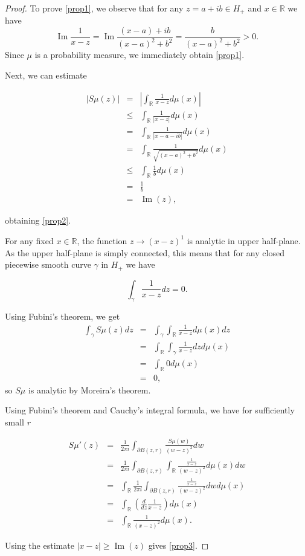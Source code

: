 \documentclass[12pt,a4paper,leqno]{report}
\newcommand{\R}{\mathbb{R}}
\renewcommand{\Im}{\operatorname{Im}}
\theoremstyle{plain}
\theoremstyle{definition}
\theoremstyle{remark}
\begin{document}
\begin{proof}
To prove \ref{prop1}, we observe that for any $z = a + ib \in H_+$ and $x \in \R$ we have
\begin{equation*}
\Im\frac{1}{x-z} = \Im\frac{(x-a) +ib}{(x-a)^2+b^2} = \frac{b}{(x-a)^2+b^2} > 0.
\end{equation*}
Since $\mu$ is a probability measure, we immediately obtain \ref{prop1}.

Next, we can estimate

\begin{eqnarray*}
|S\mu(z)| & = & \left| \int_{\R} \frac{1}{x-z} d \mu(x)  \right|\\
& \leq & \int_{\R} \frac{1}{|x-z|} d \mu(x)\\
& = & \int_{\R} \frac{1}{|x-a-ib|} d \mu(x)\\
& = & \int_{\R} \frac{1}{\sqrt{(x-a)^2+b^2}} d \mu(x)\\
& \leq & \int_{\R} \frac{1}{b} d \mu(x)\\
& = & \frac{1}{b}\\
& = & \Im(z),
\end{eqnarray*}

obtaining \ref{prop2}.

For any fixed $x \in \R$, the function $z \to (x-z)^1$ is analytic in upper half-plane. As the upper half-plane is simply connected, this means that for any closed piecewise smooth curve $\gamma$ in $H_+$ we have

\begin{equation*}
\int_{\gamma} \frac{1}{x-z}dz = 0.
\end{equation*}

Using Fubini's theorem, we get
\begin{eqnarray*}
\int_\gamma S\mu(z) dz & = & 
\int_{\gamma} \int_{\R} \frac{1}{x-z} d\mu(x) dz\\
& = & \int_{\R} \int_{\gamma} \frac{1}{x-z} dz d\mu(x)\\
& = & \int_{\R} 0 d\mu(x)\\
& = & 0,
\end{eqnarray*}
so $S\mu$ is analytic by Moreira's theorem.

Using Fubini's theorem and Cauchy's integral formula, we have for sufficiently small $r$ 

\begin{eqnarray*}
S\mu '(z) & = & \frac{1}{2\pi i}
\int_{\partial B(z,r)} \frac{S\mu(w)}{(w - z)^2} dw\\
& = & \frac{1}{2\pi i}
\int_{\partial B(z,r)} \int_{\R} \frac{\frac{1}{x-z}}{(w - z)^2} d\mu(x) dw\\
& = &
\int_{\R} \frac{1}{2\pi i} \int_{\partial B(z,r)} \frac{\frac{1}{x-z}}{(w - z)^2} dw d\mu(x)\\
& = & \int_{\R} \left( \frac{d}{dz} \frac{1}{x-z} \right) d\mu(x)\\
& = & \int_{\R}\frac{1}{(x-z)^2} d\mu(x).
\end{eqnarray*}

Using the estimate $|x-z| \geq \Im(z)$ gives \ref{prop3}.

\end{proof}
\end{document}
